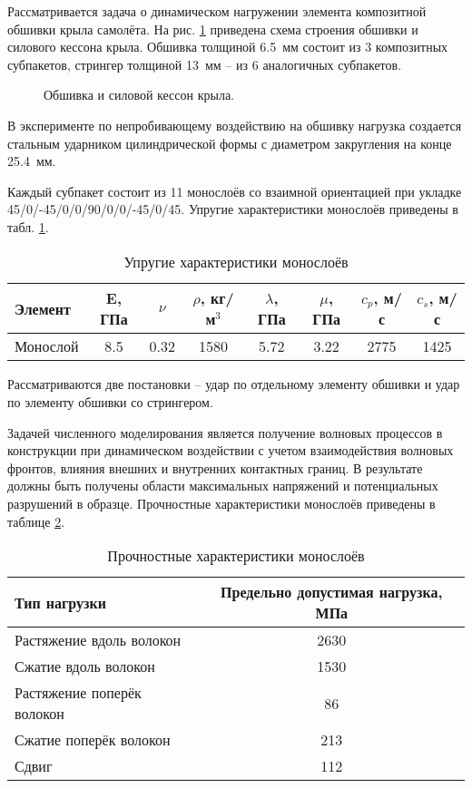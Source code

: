 
Рассматривается задача о динамическом нагружении элемента композитной обшивки крыла самолёта. На рис.
\ref{pic:construction_intro} приведена схема строения обшивки и силового кессона крыла. Обшивка толщиной 6.5~мм состоит из 3 композитных субпакетов, стрингер толщиной 13~мм -- из 6 аналогичных субпакетов.

\begin{figure}[h]
\caption{Обшивка и силовой кессон крыла.}
\label{pic:construction_intro}
\end{figure}

В эксперименте по непробивающему воздействию на обшивку нагрузка создается стальным 
ударником цилиндрической формы с диаметром закругления на конце 25.4~мм.

Каждый субпакет состоит из 11 монослоёв со взаимной ориентацией при укладке 
45/0/-45/0/0/90/0/0/-45/0/45. Упругие характеристики монослоёв приведены в табл. \ref{tbl:subpackage_intro}.

\begin{table}[h]
\centering
\caption{Упругие характеристики монослоёв}
\begin{tabular}{|p{3cm}|c|c|c|c|c|c|c|}
\hline
Элемент & E, ГПа & $\nu$ & $\rho$, кг/м$^{3}$ & $\lambda$, ГПа & $\mu$, ГПа &
$c_p$, м/с & $c_s$, м/с \\
\hline
Монослой & 8.5 & 0.32 & 1580 & 5.72 & 3.22 & 2775 & 1425 \\
\hline
\end{tabular}
\label{tbl:subpackage_intro}
\end{table}

Рассматриваются две постановки -- удар по отдельному элементу обшивки и удар по элементу обшивки со стрингером.

Задачей численного моделирования является получение волновых процессов в конструкции при динамическом воздействии с учетом взаимодействия волновых фронтов, влияния внешних и внутренних контактных границ. В результате должны быть получены области максимальных напряжений и потенциальных разрушений в образце. Прочностные характеристики монослоёв приведены в таблице \ref{tbl:max_stresses_intro}.

\begin{table}[h]
\centering
\caption{Прочностные характеристики монослоёв}
\begin{tabular}{|l|c|}
\hline
Тип нагрузки & Предельно допустимая нагрузка, МПа \\
\hline
Растяжение вдоль волокон & 2630 \\
Сжатие вдоль волокон & 1530 \\
Растяжение поперёк волокон & 86 \\
Сжатие поперёк волокон & 213 \\
Сдвиг & 112 \\
\hline
\end{tabular}
\label{tbl:max_stresses_intro}
\end{table}

